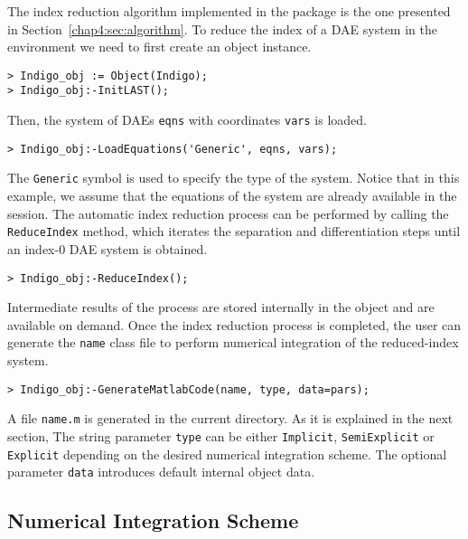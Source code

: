 The index reduction algorithm implemented in the \Indigo{} \Maple{} package is the one presented in Section~\ref{chap4:sec:algorithm}. To reduce the index of a \ac{DAE} system in the \Maple{} environment we need to first create an \Indigo{} object instance.
%
\begin{verbatim}
> Indigo_obj := Object(Indigo);
> Indigo_obj:-InitLAST();
\end{verbatim}
%
Then, the system of \acp{DAE} \texttt{eqns} with coordinates \texttt{vars} is loaded.
%
\begin{verbatim}
> Indigo_obj:-LoadEquations('Generic', eqns, vars);
\end{verbatim}
%
The \texttt{Generic} symbol is used to specify the type of the system. Notice that in this example, we assume that the equations of the system are already available in the \Maple{} session. The automatic index reduction process can be performed by calling the \texttt{ReduceIndex} method, which iterates the separation and differentiation steps until an index-$0$ \ac{DAE} system is obtained.
%
\begin{verbatim}
> Indigo_obj:-ReduceIndex();
\end{verbatim}
%
Intermediate results of the process are stored internally in the \Indigo{} object and are available on demand. Once the index reduction process is completed, the user can generate the \texttt{name} \Matlab{} class file to perform numerical integration of the reduced-index system.
%
\begin{verbatim}
> Indigo_obj:-GenerateMatlabCode(name, type, data=pars);
\end{verbatim}
%
A file \texttt{name.m} is generated in the current directory. As it is explained in the next section, The string parameter \texttt{type} can be either \texttt{Implicit}, \texttt{SemiExplicit} or \texttt{Explicit} depending on the desired numerical integration scheme. The optional parameter \texttt{data} introduces default internal object data.

\subsection{Numerical Integration Scheme}

